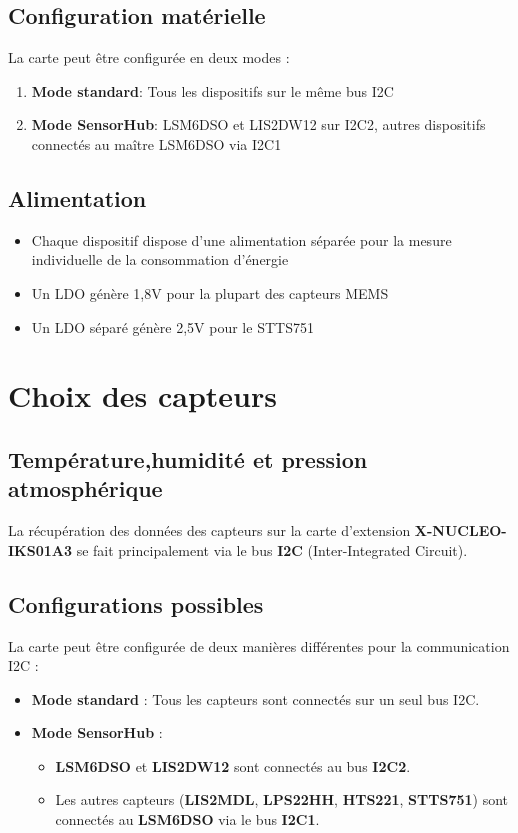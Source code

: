 \documentclass[12pt]{article}
\begin{document}
\subsection{Configuration matérielle}
La carte peut être configurée en deux modes :
\begin{enumerate}
    \item \textbf{Mode standard}: Tous les dispositifs sur le même bus I2C
    \item \textbf{Mode SensorHub}: LSM6DSO et LIS2DW12 sur I2C2, autres dispositifs connectés au maître LSM6DSO via I2C1
\end{enumerate}

\subsection{Alimentation}
\begin{itemize}
    \item Chaque dispositif dispose d'une alimentation séparée pour la mesure individuelle de la consommation d'énergie
    \item Un LDO génère 1,8V pour la plupart des capteurs MEMS
    \item Un LDO séparé génère 2,5V pour le STTS751
\end{itemize}

\section{Choix des capteurs}
\subsection{Température,humidité et pression atmosphérique}

La récupération des données des capteurs sur la carte d'extension \textbf{X-NUCLEO-IKS01A3} se fait principalement via le bus \textbf{I2C} (Inter-Integrated Circuit).

\subsection*{Configurations possibles}

La carte peut être configurée de deux manières différentes pour la communication I2C :
\begin{itemize}
    \item \textbf{Mode standard} : Tous les capteurs sont connectés sur un seul bus I2C.
    \item \textbf{Mode SensorHub} :
    \begin{itemize}
        \item \textbf{LSM6DSO} et \textbf{LIS2DW12} sont connectés au bus \textbf{I2C2}.
        \item Les autres capteurs (\textbf{LIS2MDL}, \textbf{LPS22HH}, \textbf{HTS221}, \textbf{STTS751}) sont connectés au \textbf{LSM6DSO} via le bus \textbf{I2C1}.
    \end{itemize}
\end{itemize}
\end{document}
